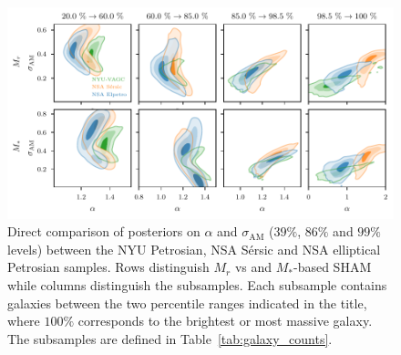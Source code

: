 \documentclass[usenatbib,useAMS]{mnras}
\newcommand{\scatter}{\ensuremath{\sigma_{\mathrm{AM}}}}
\begin{document}
\begin{figure}
    \centering
    \includegraphics[width=1.0\textwidth]{Figures/comparison_nsa2nyu.pdf}
    \caption{Direct comparison of posteriors on $\alpha$ and $\scatter$ ($39\%$, $86\%$ and $99\%$ levels) between the \ac{NYU} Petrosian, \ac{NSA} S\'ersic and \ac{NSA} elliptical Petrosian samples. Rows distinguish $M_r$ vs and $M_*$-based \ac{SHAM} while columns distinguish the subsamples. Each subsample contains galaxies between the two percentile ranges indicated in the title, where $100\%$ corresponds to the brightest or most massive galaxy. The subsamples are defined in Table~\ref{tab:galaxy_counts}.}
    \label{fig:comparison_nsa2}
\end{figure}
\end{document}
